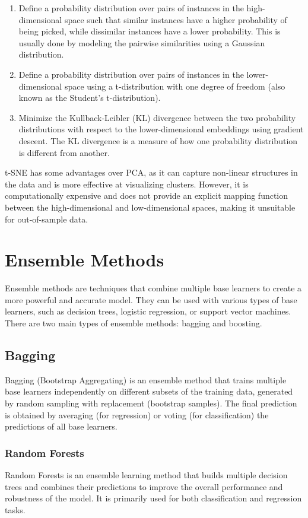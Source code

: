 \documentclass[12pt]{article}
\begin{document}
\begin{enumerate}
\item Define a probability distribution over pairs of instances in the high-dimensional space such that similar instances have a higher probability of being picked, while dissimilar instances have a lower probability. This is usually done by modeling the pairwise similarities using a Gaussian distribution.
\item Define a probability distribution over pairs of instances in the lower-dimensional space using a t-distribution with one degree of freedom (also known as the Student's t-distribution).
\item Minimize the Kullback-Leibler (KL) divergence between the two probability distributions with respect to the lower-dimensional embeddings using gradient descent. The KL divergence is a measure of how one probability distribution is different from another.
\end{enumerate}
t-SNE has some advantages over PCA, as it can capture non-linear structures in the data and is more effective at visualizing clusters. However, it is computationally expensive and does not provide an explicit mapping function between the high-dimensional and low-dimensional spaces, making it unsuitable for out-of-sample data.

\section{Ensemble Methods}

Ensemble methods are techniques that combine multiple base learners to create a more powerful and accurate model. They can be used with various types of base learners, such as decision trees, logistic regression, or support vector machines. There are two main types of ensemble methods: bagging and boosting.

\subsection{Bagging}

Bagging (Bootstrap Aggregating) is an ensemble method that trains multiple base learners independently on different subsets of the training data, generated by random sampling with replacement (bootstrap samples). The final prediction is obtained by averaging (for regression) or voting (for classification) the predictions of all base learners.

\subsubsection{Random Forests}
Random Forests is an ensemble learning method that builds multiple decision trees and combines their predictions to improve the overall performance and robustness of the model. It is primarily used for both classification and regression tasks.
\end{document}
